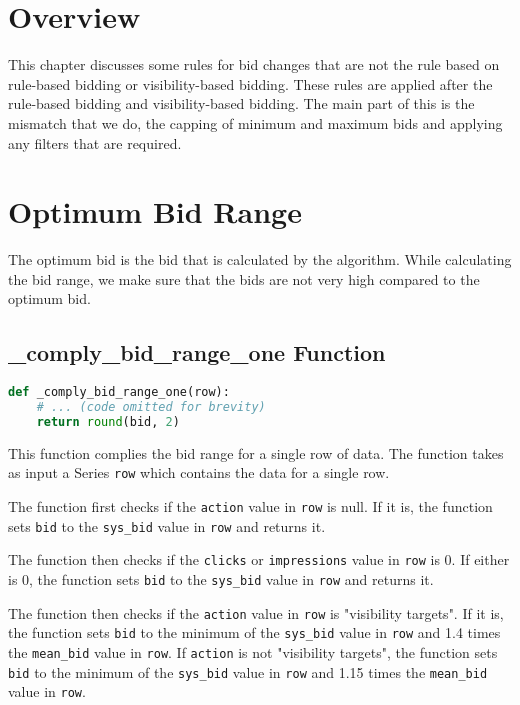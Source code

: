 \section{Overview}

This chapter discusses some rules for bid changes that are not the rule based on rule-based bidding or visibility-based bidding. These rules are applied after the rule-based bidding and visibility-based bidding. The main part of this is the mismatch that we do, the capping of minimum and maximum bids and applying any filters that are required.

\section{Optimum Bid Range}

The optimum bid is the bid that is calculated by the algorithm. While calculating the bid range, we make sure that the bids are not very high compared to the optimum bid.


\subsection{\_comply\_bid\_range\_one Function}

\begin{lstlisting}[language=Python]
def _comply_bid_range_one(row):
    # ... (code omitted for brevity)
    return round(bid, 2)
\end{lstlisting}

This function complies the bid range for a single row of data. The function takes as input a Series \verb|row| which contains the data for a single row.

The function first checks if the \verb|action| value in \verb|row| is null. If it is, the function sets \verb|bid| to the \verb|sys_bid| value in \verb|row| and returns it.

The function then checks if the \verb|clicks| or \verb|impressions| value in \verb|row| is 0. If either is 0, the function sets \verb|bid| to the \verb|sys_bid| value in \verb|row| and returns it.

The function then checks if the \verb|action| value in \verb|row| is "visibility targets". If it is, the function sets \verb|bid| to the minimum of the \verb|sys_bid| value in \verb|row| and 1.4 times the \verb|mean_bid| value in \verb|row|. If \verb|action| is not "visibility targets", the function sets \verb|bid| to the minimum of the \verb|sys_bid| value in \verb|row| and 1.15 times the \verb|mean_bid| value in \verb|row|.

